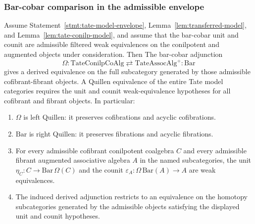 \subsubsection{Bar-cobar comparison in the admissible envelope}

\begin{thm}
  \label{thm:tate-bar-cobar-quillen}
  Assume Statement~\ref{stmt:tate-model-envelope},
  Lemma~\ref{lem:transferred-model}, and
  Lemma~\ref{lem:tate-conilp-model}, and assume that the bar-cobar unit
  and counit are admissible filtered weak equivalences on the
  conilpotent and augmented objects under consideration.  Then
  The bar-cobar adjunction
  $$\Omega\colon\mathrm{TateConilpCoAlg}\rightleftarrows
    \mathrm{TateAssocAlg}^+\colon\mathrm{Bar}$$
  gives a derived equivalence on the full subcategory generated by
  those admissible cofibrant-fibrant objects.  A Quillen equivalence
  of the entire Tate model categories requires the unit and counit
  weak-equivalence hypotheses for all cofibrant and fibrant objects.
  In particular:
  \begin{enumerate}
    \item $\Omega$ is left Quillen: it preserves cofibrations and
      acyclic cofibrations.
    \item $\mathrm{Bar}$ is right Quillen: it preserves
      fibrations and acyclic fibrations.
    \item For every admissible cofibrant conilpotent coalgebra \(C\)
      and every admissible fibrant augmented associative algebra \(A\)
      in the named subcategories, the unit
      $\eta_C\colon C\to\mathrm{Bar}\,\Omega(C)$ and the counit
      $\varepsilon_A\colon\Omega\,\mathrm{Bar}(A)\to A$ are weak
      equivalences.
    \item The induced derived adjunction restricts to an equivalence
      on the homotopy subcategories generated by the admissible
      objects satisfying the displayed unit and counit hypotheses.
  \end{enumerate}
\end{thm}

